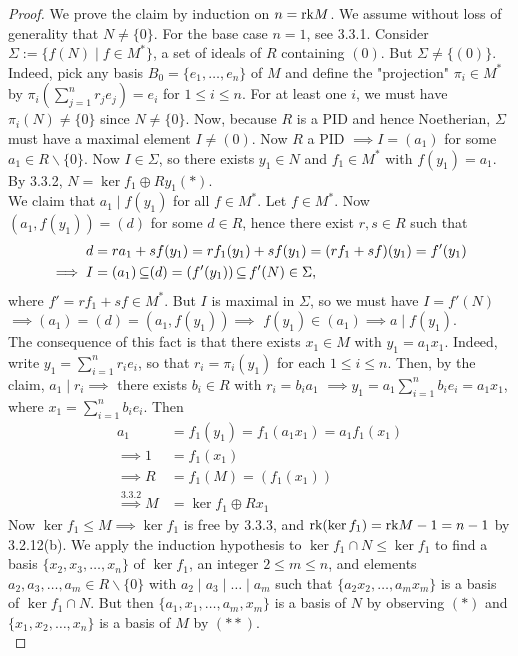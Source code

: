 \documentclass[11pt]{book}
\theoremstyle{definition}   \newtheorem{defn}[counter]{Definition} %
\newcommand{\bs}{\backslash}   \newcommand{\A}{\mathcal{A}}   \newcommand{\sy}{\textnormal{Syl}}   \newcommand{\size}[1]{\left| #1 \right|}
\numberwithin{counter}{chapter}
\begin{document}
\begin{proof}
We prove the claim by induction on $n = \textnormal{rk} M$. We assume without loss of generality that $N \ne \{0\}$. For the base case $n = 1$, see 3.3.1. Consider $\Sigma := \{f(N) \mid f \in M^*\}$, a set of ideals of $R$ containing $(0)$. But $\Sigma \ne \{(0)\}$. Indeed, pick any basis $B_0 = \{e_1,\dots,e_n\}$ of $M$ and define the "projection" $\pi_i \in M^*$ by $\pi_i(\sum_{j=1}^n r_j e_j) = e_i$ for $1 \leq i \leq n$. For at least one $i$, we must have $\pi_i(N) \ne \{0\}$ since $N \ne \{0\}$. Now, because $R$ is a PID and hence Noetherian, $\Sigma$ must have a maximal element $I \ne (0)$. Now $R$ a PID $\implies I = (a_1)$ for some $a_1 \in R \bs \{0\}$. Now $I \in \Sigma$, so there exists $y_1 \in N$ and $f_1 \in M^*$ with $f(y_1) = a_1$. By 3.3.2, $N = \ker f_1 \oplus Ry_1 (\ast)$. \\

We claim that $a_1 \mid f(y_1)$ for all $f \in M^*$. Let $f \in M^*$. Now $(a_1,f(y_1)) = (d)$ for some $d \in R$, hence there exist $r,s \in R$ such that
	\begin{align*}
	d &= ra_1 + s f(y_1) = r f_1(y_1) + s f(y_1) = (rf_1 + sf)(y_1) = f'(y_1) \\
	\implies I &= (a_1) \operatorname{\subseteq} (d) = (f'(y_1)) \operatorname{\subseteq} f'(N) \in \Sigma,
	\end{align*}
where $f' = rf_1 + sf \in M^*$. But $I$ is maximal in $\Sigma$, so we must have $I = f'(N)$ $\implies (a_1) = (d) = (a_1,f(y_1)) \implies $ $f(y_1) \in (a_1) \implies a \mid f(y_1)$. \\

The consequence of this fact is that there exists $x_1 \in M$ with $y_1 = a_1 x_1$. Indeed, write $y_1 = \sum_{i=1}^n r_i e_i$, so that $r_i = \pi_i(y_1)$ for each $1 \leq i \leq n$. Then, by the claim, $a_1 \mid r_i \implies$ there exists $b_i \in R$ with $r_i = b_i a_1 $ $\implies y_1 = a_1 \sum_{i=1}^n b_i e_i = a_1 x_1$, where $x_1 = \sum_{i=1}^n b_i e_i$. Then
	\begin{align*}
	a_1 &= f_1(y_1) = f_1(a_1x_1) = a_1 f_1(x_1) \\
	\implies 1 &= f_1(x_1) \\
	\implies R &= f_1(M) = (f_1(x_1)) \\
	\overset{3.3.2}{\implies} M &= \ker f_1 \oplus R x_1 \tag{$\ast \ast$}
	\end{align*}
Now $\ker f_1 \leq M \implies \ker f_1$ is free by 3.3.3, and $\textnormal{rk}(\ker f_1) = \textnormal{rk} M - 1 = n-1$ by 3.2.12(b). We apply the induction hypothesis to $\ker f_1 \cap N \leq \ker f_1$ to find a basis $\{x_2,x_3,\dots,x_n\}$ of $\ker f_1$, an integer $2 \leq m \leq n$, and elements $a_2,a_3,\dots,a_m \in R \bs \{0\}$ with $a_2 \mid a_3 \mid \dots \mid a_m$ such that $\{a_2x_2,\dots,a_mx_m\}$ is a basis of $\ker f_1 \cap N$. But then $\{a_1,x_1,\dots,a_m,x_m\}$ is a basis of $N$ by observing $(\ast)$ and $\{x_1,x_2,\dots,x_n\}$ is a basis of $M$ by $(\ast \ast)$. \\


\end{proof}
\end{document}
